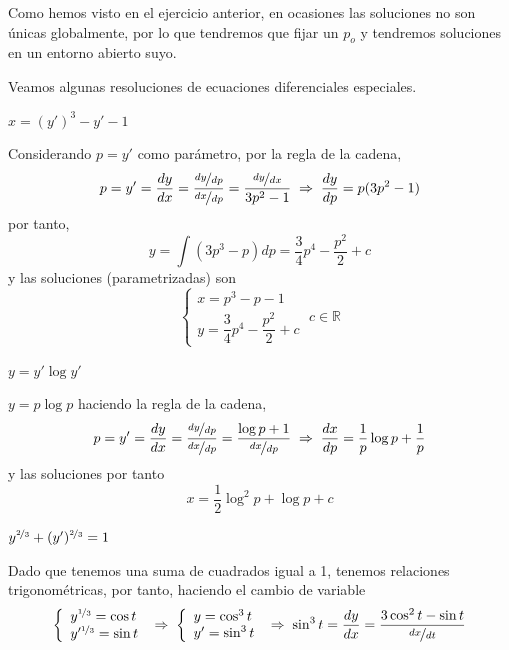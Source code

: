 \begin{obs}
    Como hemos visto en el ejercicio anterior, en ocasiones las soluciones no son únicas globalmente, por lo que tendremos que fijar un $p_o$ y tendremos soluciones en un entorno abierto suyo. 
\end{obs}
    Veamos algunas resoluciones de ecuaciones diferenciales especiales. 
    \begin{ejer}[\textbf{25.a}] $x=(y')^3-y'-1$
    \end{ejer}
    \begin{sol}
        Considerando $p=y'$ como parámetro, por la regla de la cadena,
        $$p=y'=\dfrac{dy}{dx}=\dfrac{\nicefrac{dy}{dp}}{\nicefrac{dx}{dp}}=\dfrac{\nicefrac{dy}{dx}}{3p^2-1} \; \Rightarrow \;  \dfrac{dy}{dp}=p(3p^2-1)$$
        por tanto, 
        $$y=\int (3p^3-p)dp=\dfrac{3}{4}p^4-\dfrac{p^2}{2}+c$$
        y las soluciones (parametrizadas) son 
        $$\left\{\begin{array}{l}
             x=p^3-p-1  \\
             y=\dfrac{3}{4}p^4-\dfrac{p^2}{2}+c
        \end{array}\right. \; c \in \mathbb R$$
    \end{sol}
    \begin{ejer}[\textbf{25.c}] $y=y' \log y'$
    \end{ejer}
    \begin{sol}
        $y=p \log p$
        haciendo la regla de la cadena,
        $$p=y'=\dfrac{dy}{dx}=\dfrac{\nicefrac{dy}{dp}}{\nicefrac{dx}{dp}}=\dfrac{\log p + 1}{\nicefrac{dx}{dp}} \; \Rightarrow \; \dfrac{dx}{dp}=\dfrac{1}{p} \log p + \dfrac{1}{p}$$
        y las soluciones por tanto
        $$\boxed{x=\dfrac{1}{2}\log^2 p + \log p + c}$$
    \end{sol}
    \begin{eje}[\textbf{25.f}] $y^{\nicefrac{2}{3}}+(y')^{\nicefrac{2}{3}}=1$
    \end{eje}
    \begin{sol}
        Dado que tenemos una suma de cuadrados igual a 1, tenemos relaciones trigonométricas, por tanto, haciendo el cambio de variable
        $$\left\{ \begin{array}{l}
             y^{\nicefrac{1}{3}}=\cos t  \\
             y'^{\nicefrac{1}{3}}=\sin t
        \end{array} \right. \; \Rightarrow \; \left\{ \begin{array}{l}
             y=\cos^3 t  \\
             y'=\sin^3 t
        \end{array} \right. \; \Rightarrow \; \sin^3 t= \dfrac{dy}{dx}=\dfrac{3\cos^2 t - \sin t}{\nicefrac{dx}{dt}}$$
    \end{sol}
